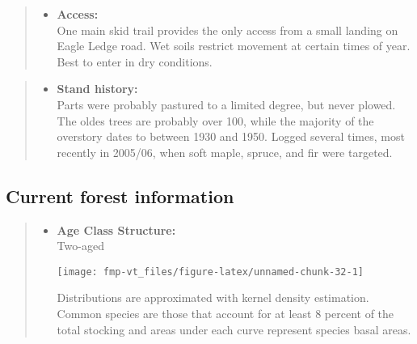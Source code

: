 \documentclass[]{tufte-handout}
\providecommand{\tightlist}{%
  \setlength{\itemsep}{0pt}\setlength{\parskip}{0pt}}
\begin{document}
\begin{quote}
\begin{itemize}
\tightlist
\item
  \textbf{Access:}\\
  \vspace{2pt} One main skid trail provides the only access from a small
  landing on Eagle Ledge road. Wet soils restrict movement at certain
  times of year. Best to enter in dry conditions.
\end{itemize}
\end{quote}

\begin{quote}
\begin{itemize}
\tightlist
\item
  \textbf{Stand history:}\\
  \vspace{2pt} Parts were probably pastured to a limited degree, but
  never plowed. The oldes trees are probably over 100, while the
  majority of the overstory dates to between 1930 and 1950. Logged
  several times, most recently in 2005/06, when soft maple, spruce, and
  fir were targeted.
\end{itemize}
\end{quote}

\subsection{Current forest
information}\label{current-forest-information-6}

\begin{quote}
\begin{itemize}
\tightlist
\item
  \textbf{Age Class Structure:}\\
  \vspace{2pt} Two-aged\\

  \begin{marginfigure}
  \texttt{[image: fmp-vt\_files/figure-latex/unnamed-chunk-32-1]} \caption[Distributions are approximated with kernel density estimation]{Distributions are approximated with kernel density estimation. Common species are those that account for at least 8 percent of the total stocking and areas under each curve represent species basal areas.}\label{fig:unnamed-chunk-32}
  \end{marginfigure}
\end{itemize}
\end{quote}
\end{document}
